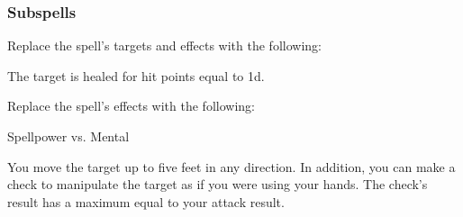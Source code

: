 \subsubsection{Subspells}





Replace the spell's targets and effects with the following:
\begin{spellcontent}

\begin{augmenttargetinginfo}




\end{augmenttargetinginfo}


\begin{augmenteffects}



\spelleffect
The target is healed for hit points equal to  \plus1d.






\end{augmenteffects}

\end{spellcontent}








Replace the spell's effects with the following:
\begin{spellcontent}

\begin{augmenteffects}




\begin{spellattack}{Spellpower vs. Mental}


\hit
You move the target up to five feet in any direction.
In addition, you can make a check to manipulate the target as if you were using your hands.
The check's result has a maximum equal to your attack result.



\end{spellattack}





\end{augmenteffects}

\end{spellcontent}





